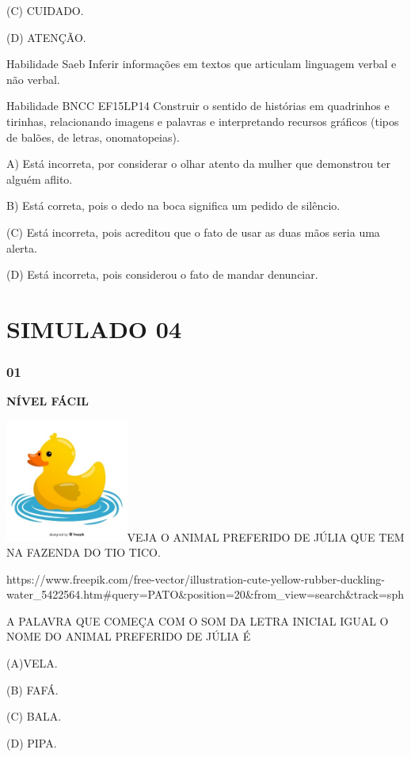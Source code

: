 (C) CUIDADO.

(D) ATENÇÃO.

Habilidade Saeb Inferir informações em textos que articulam linguagem
verbal e não verbal.

Habilidade BNCC EF15LP14 Construir o sentido de histórias em quadrinhos
e tirinhas, relacionando imagens e palavras e interpretando recursos
gráficos (tipos de balões, de letras, onomatopeias).

A) Está incorreta, por considerar o olhar atento da mulher que
demonstrou ter alguém aflito.

B) Está correta, pois o dedo na boca significa um pedido de silêncio.

(C) Está incorreta, pois acreditou que o fato de usar as duas mãos seria
uma alerta.

(D) Está incorreta, pois considerou o fato de mandar denunciar.

\section{SIMULADO 04}\label{simulado-04}

\subsubsection{01}\label{section-143}

\textbf{NÍVEL FÁCIL}

\includegraphics[width=1.58974in,height=1.58974in]{media/image174.jpeg}VEJA
O ANIMAL PREFERIDO DE JÚLIA QUE TEM NA FAZENDA DO TIO TICO.

https://www.freepik.com/free-vector/illustration-cute-yellow-rubber-duckling-water\_5422564.htm\#query=PATO\&position=20\&from\_view=search\&track=sph

A PALAVRA QUE COMEÇA COM O SOM DA LETRA INICIAL IGUAL O NOME DO ANIMAL
PREFERIDO DE JÚLIA É

(A)VELA.

(B) FAFÁ.

(C) BALA.

(D) PIPA.

